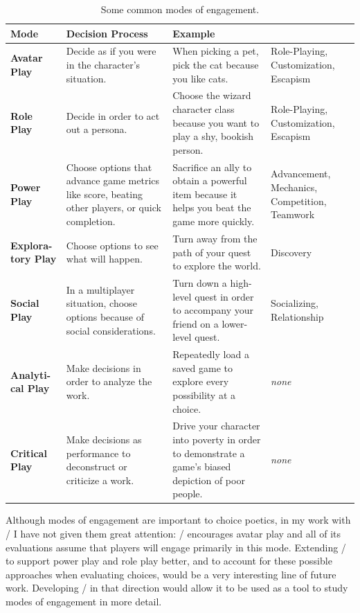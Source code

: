 \begin{table}[!p]
\begingroup
\renewcommand*{\arraystretch}{1.5}
\begin{tabular}{p{5em}p{10em}p{10em}p{6.9em}}
\textbf{Mode} & \textbf{Decision Process} & \textbf{Example} & \textbf{\citep{Yee2006}} \\
\hline
\textbf{Avatar Play} & Decide as if you were in the character's situation. & When picking a pet, pick the cat because you like cats. & Role-Playing, Customization, Escapism \\
\textbf{Role Play} & Decide in order to act out a persona. & Choose the wizard character class because you want to play a shy, bookish person. & Role-Playing, Customization, Escapism \\
\textbf{Power Play} & Choose options that advance game metrics like score, beating other players, or quick completion. & Sacrifice an ally to obtain a powerful item because it helps you beat the game more quickly. & Advancement, Mechanics, Competition, Teamwork \\
\textbf{Explora-tory Play} & Choose options to see what will happen. & Turn away from the path of your quest to explore the world. & Discovery \\
\textbf{Social Play} & In a multiplayer situation, choose options because of social considerations. & Turn down a high-level quest in order to accompany your friend on a lower-level quest. & Socializing, \newline Relationship \\
\textbf{Analyti-cal Play} & Make decisions in order to analyze the work. & Repeatedly load a saved game to explore every possibility at a choice. & \emph{none} \\
\textbf{Critical Play} & Make decisions as performance to deconstruct or criticize a work. & Drive your character into poverty in order to demonstrate a game's biased depiction of poor people. & \emph{none} \\
\end{tabular}
\endgroup
\caption[Modes of engagement]{Some common modes of engagement.}
\label{tab:modes-of-engagement}
\end{table}

Although modes of engagement are important to choice poetics, in my work with \dunyazad/ I have not given them great attention: \dunyazad/ encourages avatar play and all of its evaluations assume that players will engage primarily in this mode.
%
Extending \dunyazad/ to support power play and role play better, and to account for these possible approaches when evaluating choices, would be a very interesting line of future work.
%
Developing \dunyazad/ in that direction would allow it to be used as a tool to study modes of engagement in more detail.


